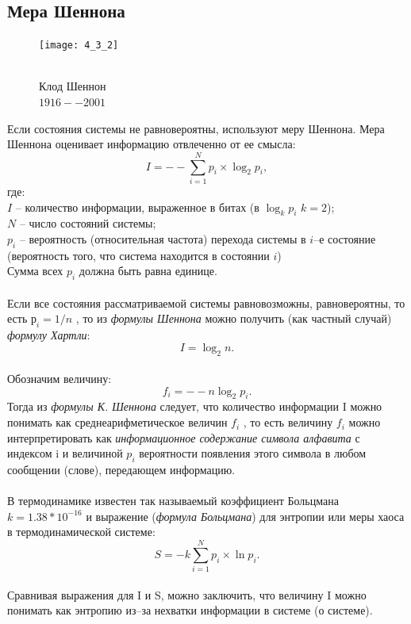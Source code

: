 \subsection{Мера Шеннона }
\begin{figure}
\texttt{[image: 4\_3\_2]}
\begin{center}
\caption{
\\\footnotesize{Клод Шеннон}
\\\footnotesize{$1916 -- 2001$}\\}
\end{center}
\end{figure}

Если состояния системы не равновероятны, используют меру Шеннона. Мера Шеннона оценивает информацию отвлеченно от ее смысла:
$$I = -- \sum^{N}_{i=1}p_{i}\times \log_{2}p_{i},$$ где:
\\$I$ -- количество информации, выраженное в битах (в $\log_{k}p_{i}$ $k = 2$);
\\$N$ -- число состояний системы;
\\$p_{i}$ -- вероятность (относительная частота) перехода системы в $i$--е состояние (вероятность того, что система находится в состоянии $i$) \\Сумма всех $p_{i}$ должна быть равна единице.\\
\\Если все состояния рассматриваемой системы равновозможны, равновероятны, то есть $р_i = 1/n$ , то из \emph{формулы Шеннона} можно получить (как частный случай) \emph{формулу Хартли}:
$$I = \log_{2}n.$$
\\Обозначим величину:
$$f_i = --n\log_{2}p_i.$$
\newpage
Тогда из \emph{формулы К. Шеннона} следует, что количество информации I можно понимать как среднеарифметическое величин $f_i$ , то есть величину $f_i$ можно интерпретировать как \emph{информационное содержание символа алфавита} с индексом i и величиной $p_i$ вероятности появления этого символа в любом сообщении (слове), передающем информацию.\\
\\ В термодинамике известен так называемый коэффициент Больцмана $k = 1.38 * 10^{-16}$ и выражение (\emph{формула Больцмана}) для энтропии или меры хаоса в термодинамической системе:
$$ S = -k \sum^{N}_{i=1}p_{i}\times \ln{p_{i}}.$$
\\ Сравнивая выражения для I и S, можно заключить, что величину I можно понимать как энтропию из--за нехватки информации в системе (о системе).\\
